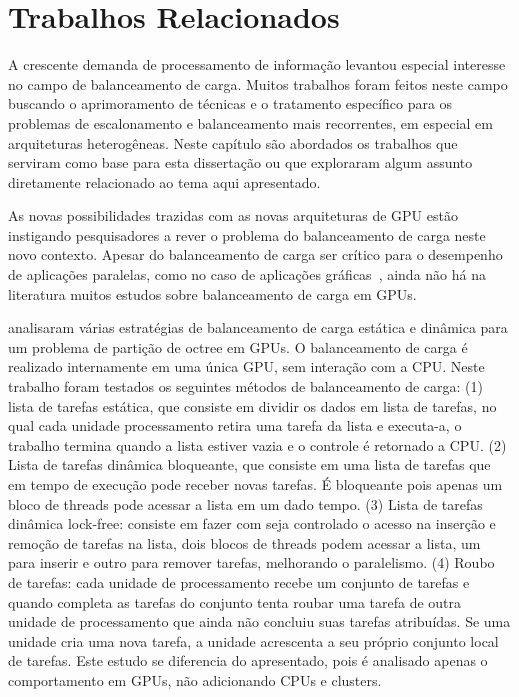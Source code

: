 \pagestyle{empty}
\cleardoublepage
\pagestyle{fancy}

\onehalfspacing

\chapter{Trabalhos Relacionados}\label{cap2}


A crescente demanda de processamento de informação levantou especial interesse no campo de balanceamento de carga. Muitos trabalhos foram feitos neste campo buscando o aprimoramento de técnicas e o tratamento específico para os problemas de escalonamento e balanceamento mais recorrentes, em especial em arquiteturas heterogêneas. Neste capítulo são abordados os trabalhos que serviram como base para esta dissertação ou que exploraram algum assunto diretamente relacionado ao tema aqui apresentado. 

As novas possibilidades trazidas com as novas arquiteturas de GPU
estão instigando pesquisadores a rever o problema do balanceamento de
carga neste novo contexto. Apesar do balanceamento de carga ser crítico para o desempenho de aplicações paralelas, como no caso de aplicações gráficas~\citep{kdtree, ray}, ainda não há na literatura muitos estudos sobre balanceamento de carga em GPUs.

\citep{graphics} analisaram várias estratégias de balanceamento de carga estática
e dinâmica para um problema de partição de octree em GPUs. O balanceamento de
carga é realizado internamente em uma única GPU, sem interação com a CPU. Neste trabalho foram testados os seguintes métodos de balanceamento de carga: (1) lista de tarefas estática, que consiste em dividir os dados em lista de tarefas, no qual cada unidade processamento retira uma tarefa da lista e executa-a, o trabalho termina quando a lista estiver vazia e o controle é retornado a CPU. (2) Lista de tarefas dinâmica bloqueante, que consiste em uma lista de tarefas que em tempo de execução pode receber novas tarefas. É bloqueante pois apenas um bloco de threads pode acessar a lista em um dado tempo. (3) Lista de tarefas dinâmica lock-free: consiste  
em fazer com seja controlado o acesso na inserção  e remoção de tarefas na lista, dois blocos de threads podem acessar a lista, um para inserir e outro para remover tarefas, melhorando o paralelismo. (4) Roubo de tarefas: cada unidade de processamento recebe um conjunto de tarefas e quando completa as tarefas do conjunto tenta roubar uma tarefa de outra unidade de processamento que ainda não concluiu suas tarefas atribuídas. Se uma unidade cria uma nova tarefa, a unidade acrescenta a seu próprio conjunto local de tarefas. Este estudo se diferencia do apresentado, pois é analisado apenas o comportamento em GPUs, não adicionando CPUs e clusters. 

